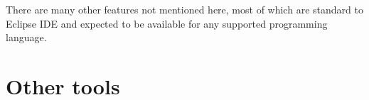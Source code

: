 There are many other features not mentioned here, most of which are
standard to Eclipse IDE and expected to be available for any supported
programming language.

\section{Other tools}



